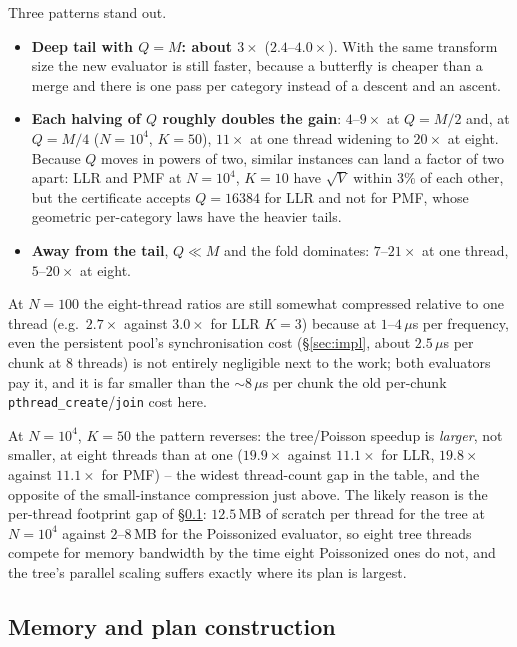 \documentclass[11pt]{article}
\begin{document}
Three patterns stand out.
\begin{itemize}
  \item \textbf{Deep tail with $Q=M$: about $3\times$} ($2.4$--$4.0\times$). With the same transform
        size the new evaluator is still faster, because a butterfly is cheaper than a merge and there
        is one pass per category instead of a descent and an ascent.
  \item \textbf{Each halving of $Q$ roughly doubles the gain}: $4$--$9\times$ at $Q=M/2$ and, at
        $Q=M/4$ ($N=10^4$, $K=50$), $11\times$ at one thread widening to $20\times$ at eight. Because
        $Q$ moves in powers of two, similar instances can land a factor of two apart: LLR and PMF at
        $N=10^4$, $K=10$ have $\sqrt V$ within $3\%$ of each other, but the certificate accepts
        $Q=16384$ for LLR and not for PMF, whose geometric per-category laws have the heavier tails.
  \item \textbf{Away from the tail}, $Q\ll M$ and the fold dominates: $7$--$21\times$ at one thread,
        $5$--$20\times$ at eight.
\end{itemize}
At $N=100$ the eight-thread ratios are still somewhat compressed relative to one thread (e.g.\
$2.7\times$ against $3.0\times$ for LLR $K=3$) because at $1$--$4\,\mu$s per frequency, even the
persistent pool's synchronisation cost (\S\ref{sec:impl}, about $2.5\,\mu$s per chunk at 8 threads)
is not entirely negligible next to the work; both evaluators pay it, and it is far smaller than the
$\sim$$8\,\mu$s per chunk the old per-chunk \texttt{pthread\_create}/\texttt{join} cost here.

At $N=10^4$, $K=50$ the pattern reverses: the tree/Poisson speedup is \emph{larger}, not smaller,
at eight threads than at one ($19.9\times$ against $11.1\times$ for LLR, $19.8\times$ against
$11.1\times$ for PMF) -- the widest thread-count gap in the table, and the opposite of the
small-instance compression just above. The likely reason is the per-thread footprint gap of
\S\ref{sec:memplan}: $12.5$\,MB of scratch per thread for the tree at $N=10^4$ against $2$--$8$\,MB
for the Poissonized evaluator, so eight tree threads compete for memory bandwidth by the time eight
Poissonized ones do not, and the tree's parallel scaling suffers exactly where its plan is largest.

\subsection{Memory and plan construction}
\label{sec:memplan}
\end{document}
